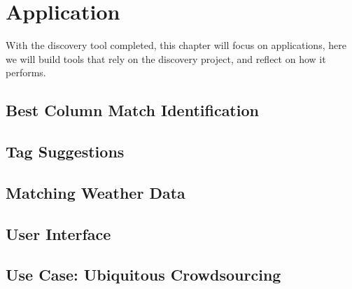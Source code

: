 \chapter{Application}\label{ch:application}
With the discovery tool completed, this chapter will focus on applications, here we will build tools that rely on the
discovery project, and reflect on how it performs.

\section{Best Column Match Identification}\label{sec:best-column-match-id}


\section{Tag Suggestions}\label{sec:tag-suggestions}


\section{Matching Weather Data}\label{sec:matching-weather-data}


\section{User Interface}\label{sec:user-interface}


\section{Use Case: Ubiquitous Crowdsourcing}\label{sec:ubiquitous-crowdsourcing}
